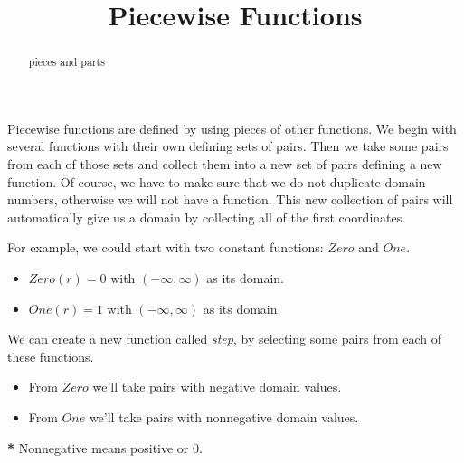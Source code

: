 \documentclass{ximera}
\title{Piecewise Functions}
\begin{document}
\begin{abstract}
pieces and parts
\end{abstract}
\maketitle



Piecewise functions are defined by using pieces of other functions. We begin with several functions with their own defining sets of pairs.  Then we take some pairs from each of those sets and collect them into a new set of pairs defining a new function.  Of course, we have to make sure that we do not duplicate domain numbers, otherwise we will not have a function.  This new collection of pairs will automatically give us a domain by collecting all of the first coordinates.

For example, we could start with two constant functions: $Zero$ and $One$.

\begin{itemize}
\item $Zero(r) = 0$ with $(-\infty, \infty)$ as its domain.
\item $One(r) = 1$ with $(-\infty, \infty)$ as its domain.
\end{itemize}

We can create a new function called \textit{step}, by selecting some pairs from each of these functions.  
\begin{itemize}
\item From $Zero$ we'll take pairs with negative domain values.
\item From $One$ we'll take pairs with nonnegative domain values.
\end{itemize}

\textbf{*} Nonnegative means positive or 0.
\end{document}
